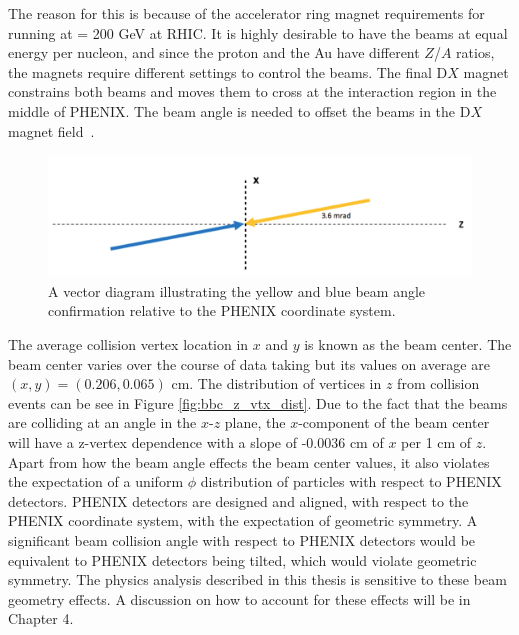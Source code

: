 The reason for this is because of the accelerator ring magnet requirements for running \pau at \sqsn = 200 GeV at RHIC. It is highly desirable to have the beams at equal energy per nucleon, and since the proton and the Au have different $Z$/$A$ ratios, the magnets require different settings to control the beams. The final D$X$ magnet constrains both beams and moves them to cross at the interaction region in the middle of PHENIX. The beam angle is needed to offset the beams in the D$X$ magnet field~\cite{BNL_Run15_Operations}.

\begin{figure}[!ht]
\centering
\includegraphics[width=0.85\linewidth]{figs/beam_angle.png}
\caption{A vector diagram illustrating the yellow and blue beam angle confirmation relative to the PHENIX coordinate system.}
\label{fig:beam_angle}
\end{figure}

The average collision vertex location in $x$ and $y$ is known as the beam center. The beam center varies over the course of data taking but its values on average are $(x,y) = (0.206,0.065)$ cm. The distribution of vertices in $z$ from collision events can be see in Figure \ref{fig:bbc_z_vtx_dist}. Due to the fact that the beams are colliding at an angle in the $x$-$z$ plane, the $x$-component of the beam center will have a z-vertex dependence with a slope of -0.0036 cm of $x$ per 1 cm of $z$.
Apart from how the beam angle effects the beam center values, it also violates the expectation of a uniform $\phi$ distribution of particles with respect to PHENIX detectors. PHENIX detectors are designed and aligned, with respect to the PHENIX coordinate system, with the expectation of geometric symmetry. A significant beam collision angle with respect to PHENIX detectors would be equivalent to PHENIX detectors being tilted, which would violate geometric symmetry.
The physics analysis described in this thesis is sensitive to these beam geometry effects. A discussion on how to account for these effects will be in Chapter 4.


